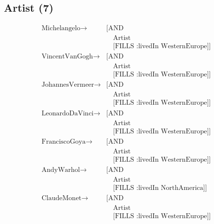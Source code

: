     \subsection{Artist (7)}
    \begin{align*}
    \text{Michelangelo} \to& \text{[AND} \\
    &\quad \text{Artist} \\
    &\quad \text{[FILLS :livedIn WesternEurope]]} \\
    \text{VincentVanGogh} \to& \text{[AND} \\
    &\quad \text{Artist} \\
    &\quad \text{[FILLS :livedIn WesternEurope]]} \\
    \text{JohannesVermeer} \to& \text{[AND} \\
    &\quad \text{Artist} \\
    &\quad \text{[FILLS :livedIn WesternEurope]]} \\
    \text{LeonardoDaVinci} \to& \text{[AND} \\
    &\quad \text{Artist} \\
    &\quad \text{[FILLS :livedIn WesternEurope]]} \\
    \text{FranciscoGoya} \to& \text{[AND} \\
    &\quad \text{Artist} \\
    &\quad \text{[FILLS :livedIn WesternEurope]]} \\
    \text{AndyWarhol} \to& \text{[AND} \\
    &\quad \text{Artist} \\
    &\quad \text{[FILLS :livedIn NorthAmerica]]} \\
    \text{ClaudeMonet} \to& \text{[AND} \\
    &\quad \text{Artist} \\
    &\quad \text{[FILLS :livedIn WesternEurope]]}
    \end{align*}
    
